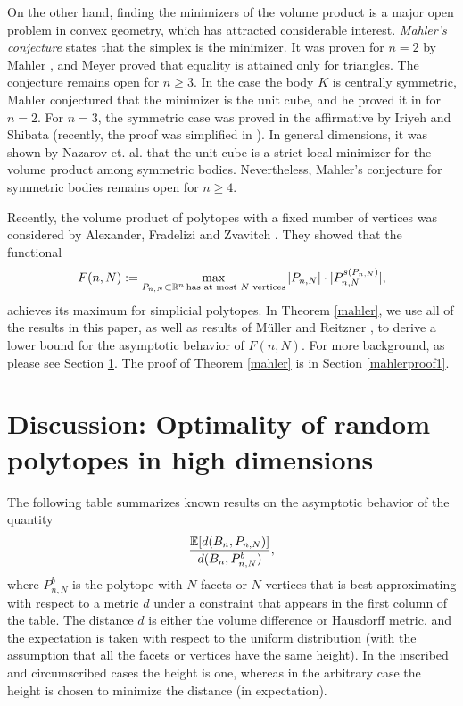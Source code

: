 On the other hand, finding the minimizers of the  volume product is a major open problem in convex geometry, which has attracted considerable interest. {\it Mahler's conjecture} \cite{mahler1} states  that the simplex is the minimizer. It was proven for $n=2$ by Mahler \cite{mahler2}, and Meyer \cite{meyer1991} proved that equality is attained only for triangles. The conjecture remains open for $n\geq 3$. In the case the body $K$ is centrally symmetric, Mahler \cite{mahler1} conjectured that the minimizer is the unit cube, and he proved it in \cite{mahler2} for $n=2$. For $n=3$, the symmetric case was proved in the affirmative by Iriyeh and Shibata \cite{iriyehshibata} (recently, the proof was simplified in \cite{equipartition}). In general dimensions, it was shown by Nazarov et. al. \cite{NPRZ} that the unit cube is a strict local minimizer for the volume product among symmetric bodies. Nevertheless, Mahler's conjecture for symmetric bodies remains open for $n\geq 4$.

Recently, the volume product of polytopes with a fixed number of vertices was considered by Alexander, Fradelizi and Zvavitch \cite{alexander2017polytopes}. They showed that the functional
\[
F(n,N):=\max_{P_{n,N} \subset \operatorname{\mathbb{R}}^{n} \text {has at most $N$ vertices}} |P_{n,N}|\cdot|P^{s(P_{n,N})}_{n,N}|,
\]
achieves its maximum for simplicial polytopes. 
In Theorem \ref{mahler}, we use all of the results in this paper, as well as  results of M\"uller \cite{muller1990approximation} and Reitzner \cite{reitzner2003random}, to derive a lower bound for the asymptotic behavior of $ F(n,N)$.  For more background, as  please see Section \ref{resultstable}. The proof of Theorem \ref{mahler} is in Section \ref{mahlerproof1}.

\section{Discussion: Optimality of random polytopes in high dimensions}\label{resultstable}

The following table summarizes known results on the asymptotic behavior of the quantity $$\frac{{\mathbb{E}}[d(B_n,P_{n,N})]}{ d(B_n,P_{n,N}^b)},$$ 
where $P_{n,N}^b$ is the polytope with $N$ facets or $N$ vertices that is best-approximating with respect to a metric $d$ under a constraint that appears in the first column of the table. The distance $d$ is either the volume difference or Hausdorff metric, and the expectation is taken with respect to the uniform distribution (with the assumption that all the facets or vertices have the same height). In the inscribed and circumscribed cases the height is one, whereas in the arbitrary case the height is chosen to minimize the distance (in expectation).

